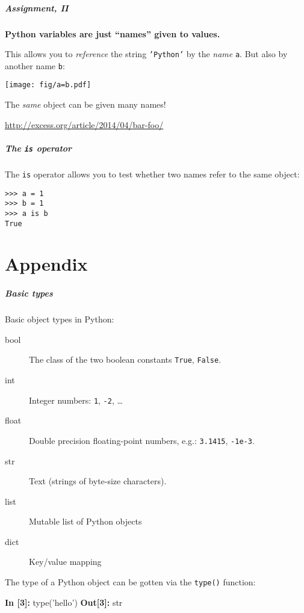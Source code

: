 \documentclass[english,serif,mathserif,xcolor=pdftex,dvipsnames,table]{beamer}
\begin{document}
\begin{frame}[fragile]
  \frametitle{Assignment, II}

  \textbf{Python variables are just ``names'' given to values.}

  \+
  This allows you to \emph{reference} the string \texttt{'Python'}
  by the \emph{name} \texttt{a}.  But also by another name \texttt{b}:

  \+
  \texttt{[image: fig/a=b.pdf]}

  \+
  The \emph{same} object can be given many names!

  \+
  \begin{seealso}
    \scriptsize \url{http://excess.org/article/2014/04/bar-foo/}
  \end{seealso}
\end{frame}


\begin{frame}[fragile]
  \frametitle{The \texttt{is} operator}

  The \texttt{is} operator allows you to test whether two names refer
  to the same object:
\begin{lstlisting}
>>> a = 1
>>> b = 1
>>> a is b
True
\end{lstlisting}

\end{frame}


\part{Appendix}

\begin{frame}[fragile]
  \frametitle{Basic types}
  Basic object types in Python:
  \begin{description}
  \item[bool] The class of the two boolean constants \texttt{True}, \texttt{False}.
  \item[int] Integer numbers: \texttt{1}, \texttt{-2}, \ldots
  \item[float] Double precision floating-point numbers, e.g.:
    \texttt{3.1415}, \texttt{-1e-3}.
  \item[str] Text (strings of byte-size characters).
  \item[list] Mutable list of Python objects
  \item[dict] Key/value mapping
  \end{description}

  \+ The type of a Python object can be gotten via the \texttt{type()} function:
\begin{semiverbatim}
{\color{blue}\bfseries In [3]:} type('hello')
{\color{red}\bfseries Out[3]:} str
\end{semiverbatim}
\end{frame}
\end{document}
